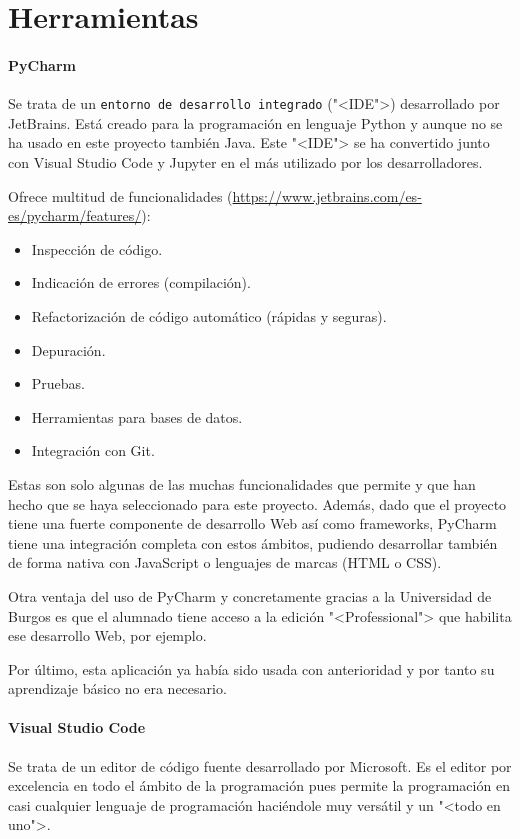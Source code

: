 \section{Herramientas}

\paragraph{PyCharm}
Se trata de un \texttt{entorno de desarrollo integrado} ("<IDE">) desarrollado por
JetBrains. Está creado para la programación en lenguaje Python y aunque no se ha
usado en este proyecto también Java. Este "<IDE"> se ha convertido junto con Visual
Studio Code y Jupyter en el más utilizado por los desarrolladores.

Ofrece multitud de funcionalidades (\url{https://www.jetbrains.com/es-es/pycharm/features/}):
\begin{itemize}
	\item Inspección de código.
	\item Indicación de errores (compilación).
	\item Refactorización de código automático (rápidas y seguras).
	\item Depuración.
	\item Pruebas.
	\item Herramientas para bases de datos.
	\item Integración con Git.
\end{itemize}

Estas son solo algunas de las muchas funcionalidades que permite y que han hecho
que se haya seleccionado para este proyecto. Además, dado que el proyecto tiene
una fuerte componente de desarrollo Web así como frameworks, PyCharm tiene una
integración completa con estos ámbitos, pudiendo desarrollar también de forma
nativa con JavaScript o lenguajes de marcas (HTML o CSS).

Otra ventaja del uso de PyCharm y concretamente gracias a la Universidad de
Burgos es que el alumnado tiene acceso a la edición "<Professional"> que
habilita ese desarrollo Web, por ejemplo.

Por último, esta aplicación ya había sido usada con anterioridad y por tanto su
aprendizaje básico no era necesario.

\paragraph{Visual Studio Code}
Se trata de un editor de código fuente desarrollado por Microsoft. Es el editor
por excelencia en todo el ámbito de la programación pues permite la programación
en casi cualquier lenguaje de programación haciéndole muy versátil y un "<todo
en uno">.

